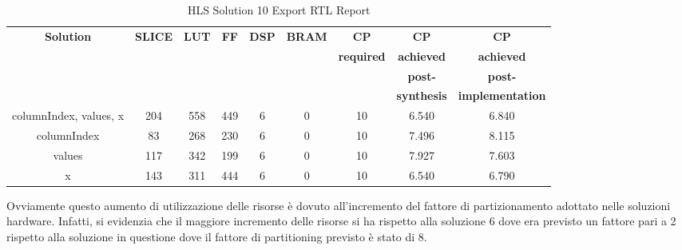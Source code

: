\begin{table}[H]
	\centering
	\begin{tabular}{|c|c|c|c|c|c|c|c|c|}
		\hline
		\textbf{Solution} & \textbf{SLICE} & \textbf{LUT} & \textbf{FF} & \textbf{DSP} & \textbf{BRAM} & \textbf{CP} & \textbf{CP} & \textbf{CP} \\
		& & & & & & \textbf{required} & \textbf{achieved} & \textbf{achieved}\\
		& & & & & & & \textbf{post-} & \textbf{post-}\\
		& & & & & & & \textbf{synthesis} & \textbf{implementation}\\
		\hline
		columnIndex, values, x  & 204 & 558 & 449 & 6 & 0 & 10 & 6.540 & 6.840 \\
		\hline
		columnIndex  & 83 & 268 & 230 & 6 & 0 & 10 & 7.496 & 8.115 \\
		\hline
		values  & 117 & 342 & 199 & 6 & 0 & 10 & 7.927 & 7.603 \\
		\hline
		x  & 143 & 311 & 444 & 6 & 0 & 10 & 6.540 & 6.790 \\
		\hline
	\end{tabular}
	\caption{HLS Solution 10 Export RTL Report}
	\label{tab:hls-solution-10-export-rtl-report}
\end{table}

Ovviamente questo aumento di utilizzazione delle risorse è dovuto all'incremento del fattore di partizionamento adottato nelle soluzioni hardware. Infatti, si evidenzia che il maggiore incremento delle risorse si ha rispetto alla soluzione 6 dove era previsto un fattore pari a 2 rispetto alla soluzione in questione dove il fattore di partitioning previsto è stato di 8.